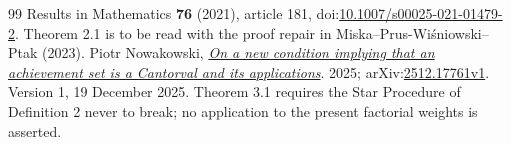 \documentclass[11pt]{article}
\begin{document}
\begin{thebibliography}{99}
  Results in Mathematics \textbf{76} (2021), article 181, doi:\href{https://doi.org/10.1007/s00025-021-01479-2}{10.1007/s00025-021-01479-2}. Theorem 2.1 is to be read with the proof repair in Miska--Prus-Wi\'sniowski--Ptak (2023).
 Piotr Nowakowski, \href{https://arxiv.org/abs/2512.17761v1}{\emph{On a new condition implying that an achievement set is a Cantorval and its applications}}.
  2025; arXiv:\href{https://arxiv.org/abs/2512.17761v1}{2512.17761v1}. Version 1, 19 December 2025. Theorem 3.1 requires the Star Procedure of Definition 2 never to break; no application to the present factorial weights is asserted.
\end{thebibliography}

\end{document}
